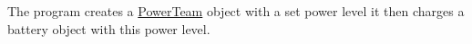 The program creates a \hyperlink{classPowerTeam}{Power\+Team} object with a set power level it then charges a battery object with this power level. 